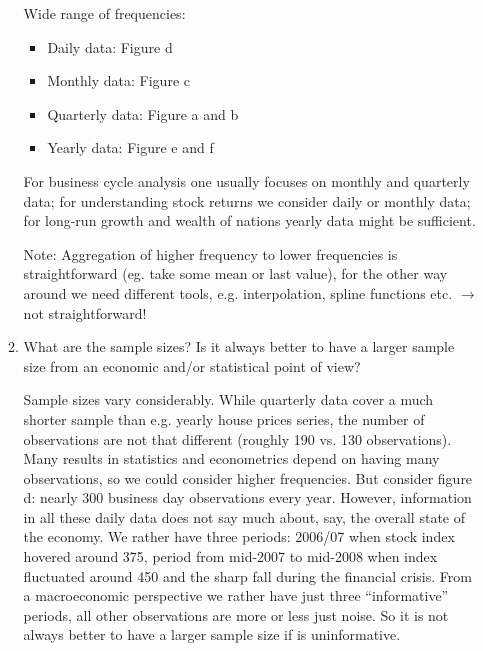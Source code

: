 \documentclass[a4paper]{scrartcl}
\begin{document}
\begin{enumerate}
\begin{enumerate}
\begin{solution}
                            Wide range of frequencies:
                            \begin{itemize}
                                \item Daily data: Figure d
                                \item Monthly data: Figure c
                                \item Quarterly data: Figure a and b
                                \item Yearly data: Figure e and f
                            \end{itemize}
                            For business cycle analysis one usually focuses on monthly and quarterly data; for understanding stock returns we consider daily or monthly data; for long-run growth and wealth of nations yearly data might be sufficient.
                            
                            Note: Aggregation of higher frequency to lower frequencies is straightforward (eg. take some mean or last value), for the other way around we need different tools, e.g. interpolation, spline functions etc. $\rightarrow$ not straightforward!
                        \end{solution}
                        
                  \item What are the sample sizes? Is it always better to have a larger sample size from an economic and/or statistical point of view?
                        \begin{solution}
                            Sample sizes vary considerably. While quarterly data cover a much shorter sample than e.g. yearly house prices series, the number of observations are not that different (roughly 190 vs. 130 observations). Many results in statistics and econometrics depend on having many observations, so we could consider higher frequencies. But consider figure d: nearly 300 business day observations every year. However, information in all these daily data does not say much about, say, the overall state of the economy. We rather have three periods: 2006/07 when stock index hovered around 375, period from mid-2007 to mid-2008 when index fluctuated around 450 and the sharp fall during the financial crisis. From a macroeconomic perspective we rather have just three \enquote{informative} periods, all other observations are more or less just noise. So it is not always better to have a larger sample size if is uninformative.
                        \end{solution}
                        

\end{enumerate}
\end{enumerate}
\end{document}
